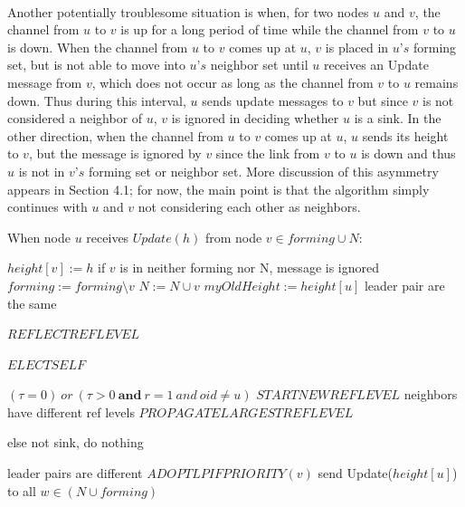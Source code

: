 \paragraph{}Another potentially troublesome situation is when, for two nodes $u$ and $v$, the channel from $u$ to $v$ is up for a long period of time while the channel from $v$ to $u$ is down. When the channel from $u$ to $v$ comes up at $u$, $v$ is placed in $u’s$ forming set, but is not able to move into $u’s$ neighbor set until $u$ receives an Update message from $v$, which does not occur as long as the channel from $v$ to $u$ remains down. Thus during this interval, $u$ sends update messages to $v$ but since $v$ is not considered a neighbor of $u$, $v$ is ignored in deciding whether $u$ is a sink. In the other direction, when the channel from $u$ to $v$ comes up at $u$, $u$ sends its height to $v$, but the message is ignored by $v$ since the link from $v$ to $u$ is down and thus $u$ is not in $v’s$ forming set or neighbor set. More discussion of this asymmetry appears in Section 4.1; for now, the main point is that the algorithm simply continues with $u$ and $v$ not considering each other as neighbors.

\begin{algorithm}
	\caption{When node $u$ receives $Update(h)$ from node $v \in forming \cup N$:}
\begin{algorithmic}[1]
	
	\State $height[v] := h$ \Comment if $v$ is in neither forming nor N, message is ignored
	\State $forming := forming \setminus {v}$
	\State $N := N \cup {v}$
	\State $myOldHeight := height[u]$
	 \Comment leader pair are the same
	
	
		\State $REFLECTREFLEVEL$
	
		\State $ELECTSELF$
		
		\Else \Comment $(\tau = 0)~or~(\tau > 0~\textbf{and}~r = 1~and~oid \neq u)$
		\State $STARTNEWREFLEVEL$
		\EndIf
	\Else \Comment neighbors have different ref levels
	\State $PROPAGATELARGESTREFLEVEL$
	
	\EndIf 
	
	\EndIf \Comment else not sink, do nothing
	
	\Else \Comment leader pairs are different
	\State $ADOPTLPIFPRIORITY(v)$	
	\EndIf
	\State send Update($height[u]$) to all $w \in (N \cup forming)$
	\EndIf
	
\end{algorithmic}

\end{algorithm}

